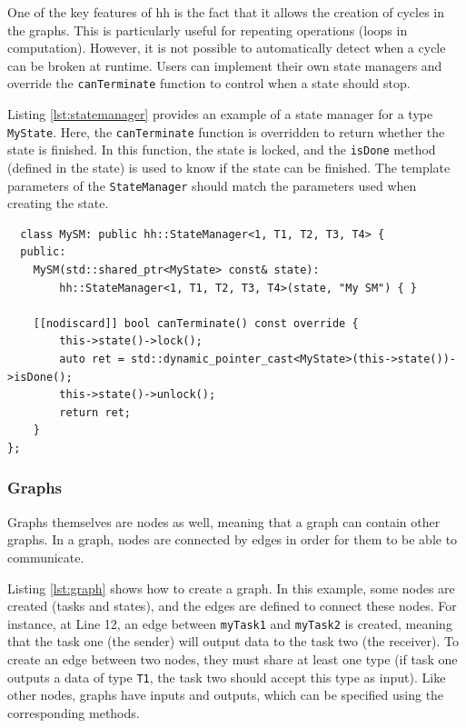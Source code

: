 One of the key features of \gls{hh} is the fact that it allows the creation of
cycles in the graphs. This is particularly useful for repeating operations
(loops in computation). However, it is not possible to automatically detect when
a cycle can be broken at runtime. Users can implement their own state managers
and override the \texttt{canTerminate} function to control when a state should
stop.

Listing \ref{lst:statemanager} provides an example of a state manager for a type
\texttt{MyState}. Here, the \texttt{canTerminate} function is overridden to
return whether the state is finished. In this function, the state is locked, and
the \texttt{isDone} method (defined in the state) is used to know if the state
can be finished. The template parameters of the \texttt{StateManager} should
match the parameters used when creating the state.

\begin{listing}[ht!]
\begin{verbatim}
  class MySM: public hh::StateManager<1, T1, T2, T3, T4> {
  public:
    MySM(std::shared_ptr<MyState> const& state):
        hh::StateManager<1, T1, T2, T3, T4>(state, "My SM") { }

    [[nodiscard]] bool canTerminate() const override {
        this->state()->lock();
        auto ret = std::dynamic_pointer_cast<MyState>(this->state())->isDone();
        this->state()->unlock();
        return ret;
    }
};
\end{verbatim}
\label{lst:statemanager}
\end{listing}

\subsubsection{Graphs}

Graphs themselves are nodes as well, meaning that a graph can contain other
graphs. In a graph, nodes are connected by edges in order for them to be able to
communicate.

Listing \ref{lst:graph} shows how to create a graph. In this example, some nodes
are created (tasks and states), and the edges are defined to connect these
nodes. For instance, at Line 12, an edge between \texttt{myTask1} and
\texttt{myTask2} is created, meaning that the task one (the sender) will output
data to the task two (the receiver). To create an edge between two nodes, they
must share at least one type (if task one outputs a data of type \texttt{T1},
the task two should accept this type as input). Like other nodes, graphs have
inputs and outputs, which can be specified using the corresponding methods.
\clearpage{}

